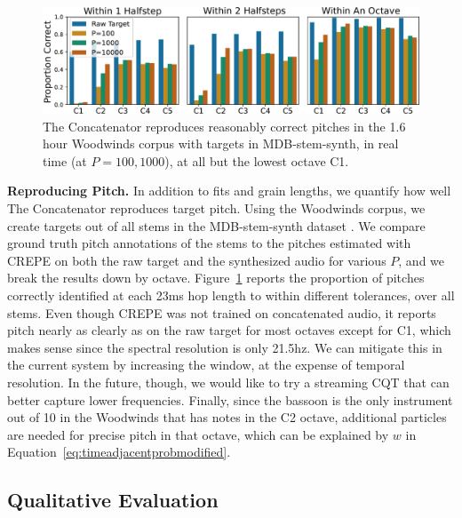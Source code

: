 \documentclass{article}
\begin{document}
\begin{figure}
    \centering
    \includegraphics[width=\columnwidth]{figs/PitchTests.pdf}
    \caption{The Concatenator reproduces reasonably correct pitches in the 1.6 hour Woodwinds corpus with targets in MDB-stem-synth, in real time (at $P=100, 1000$), at all but the lowest octave C1.}
    \label{fig:PitchTests}
\end{figure}

\textbf{Reproducing Pitch.} In addition to fits and grain lengths, we quantify how well The Concatenator reproduces target pitch.  Using the Woodwinds corpus, we create targets out of all stems in the MDB-stem-synth dataset \cite{salamon2017analysis}.  We compare ground truth pitch annotations of the stems to the pitches estimated with CREPE \cite{kim2018crepe} on both the raw target and the synthesized audio for various $P$, and we break the results down by octave.  Figure~\ref{fig:PitchTests} reports the proportion of pitches correctly identified at each 23ms hop length to within different tolerances, over all stems.  Even though CREPE was not trained on concatenated audio, it reports pitch nearly as clearly as on the raw target for most octaves except for C1, which makes sense since the spectral resolution is only 21.5hz.  We can mitigate this in the current system by increasing the window, at the expense of temporal resolution.  In the future, though, we would like to try a streaming CQT that can better capture lower frequencies.  Finally, since the bassoon is the only instrument out of 10 in the Woodwinds that has notes in the C2 octave, additional particles are needed for precise pitch in that octave, which can be explained by $w$ in Equation~\ref{eq:timeadjacentprobmodified}.




\subsection{Qualitative Evaluation}
\label{sec:qualitative}
\end{document}
